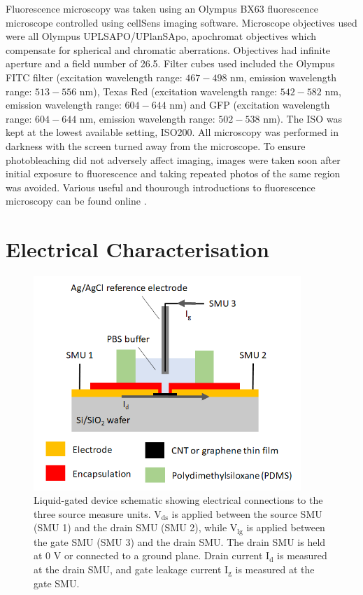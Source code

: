 \documentclass[
  a4paper,
]{scrbook}
\begin{document}
Fluorescence microscopy was taken using an Olympus BX63 fluorescence
microscope controlled using cellSens imaging software. Microscope
objectives used were all Olympus UPLSAPO/UPlanSApo, apochromat
objectives which compensate for spherical and chromatic aberrations.
Objectives had infinite aperture and a field number of 26.5. Filter
cubes used included the Olympus FITC filter (excitation wavelength
range: \(467-498\) nm, emission wavelength range: \(513-556\) nm), Texas
Red (excitation wavelength range: \(542-582\) nm, emission wavelength
range: \(604-644\) nm) and GFP (excitation wavelength range: \(604-644\)
nm, emission wavelength range: \(502-538\) nm). The ISO was kept at the
lowest available setting, ISO200. All microscopy was performed in
darkness with the screen turned away from the microscope. To ensure
photobleaching did not adversely affect imaging, images were taken soon
after initial exposure to fluorescence and taking repeated photos of the
same region was avoided. Various useful and thourough introductions to
fluorescence microscopy can be found online \autocite{Nikon,Zeiss}.

\hypertarget{sec-electrical-characterisation}{%
\section{Electrical
Characterisation}\label{sec-electrical-characterisation}}

\begin{figure}

{\centering \includegraphics[width=0.9\textwidth,height=\textheight]{./figures/ch4/liquid-gate-schematic.png}

}

\caption{\label{fig-liquid-gate-schematic}Liquid-gated device schematic
showing electrical connections to the three source measure units.
V\(_{\mathrm{ds}}\) is applied between the source SMU (SMU 1) and the
drain SMU (SMU 2), while V\(_{\mathrm{lg}}\) is applied between the gate
SMU (SMU 3) and the drain SMU. The drain SMU is held at 0 V or connected
to a ground plane. Drain current I\(_{\mathrm{d}}\) is measured at the
drain SMU, and gate leakage current I\(_{\mathrm{g}}\) is measured at
the gate SMU.}

\end{figure}
\end{document}

